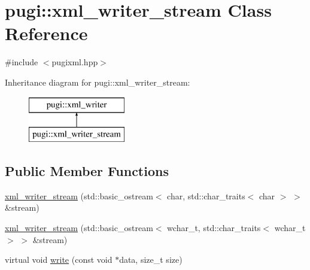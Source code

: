\hypertarget{classpugi_1_1xml__writer__stream}{\section{pugi\-:\-:xml\-\_\-writer\-\_\-stream Class Reference}
\label{classpugi_1_1xml__writer__stream}
}


{\ttfamily \#include $<$pugixml.\-hpp$>$}

Inheritance diagram for pugi\-:\-:xml\-\_\-writer\-\_\-stream\-:\begin{figure}[H]
\begin{center}
\leavevmode
\includegraphics[height=2.000000cm]{classpugi_1_1xml__writer__stream}
\end{center}
\end{figure}
\subsection*{Public Member Functions}
\begin{DoxyCompactItemize}
\item 
\hyperlink{classpugi_1_1xml__writer__stream_a259c28368c08378e15cf28b35a1dcd9a}{xml\-\_\-writer\-\_\-stream} (std\-::basic\-\_\-ostream$<$ char, std\-::char\-\_\-traits$<$ char $>$ $>$ \&stream)
\item 
\hyperlink{classpugi_1_1xml__writer__stream_afa342cf0bb3a0bd6ee3d47550ad23333}{xml\-\_\-writer\-\_\-stream} (std\-::basic\-\_\-ostream$<$ wchar\-\_\-t, std\-::char\-\_\-traits$<$ wchar\-\_\-t $>$ $>$ \&stream)
\item 
virtual void \hyperlink{classpugi_1_1xml__writer__stream_a3ec185992d56341f6ee8d1037a6efb17}{write} (const void $\ast$data, size\-\_\-t size)
\end{DoxyCompactItemize}


